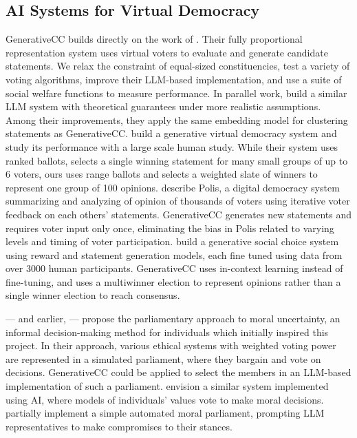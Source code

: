 \documentclass[letterpaper]{article} %
\begin{document}
\subsection{AI Systems for Virtual Democracy}
GenerativeCC builds directly on the work of \citet{fish-v2}.
Their fully proportional representation system \citep{monroe-1995} uses virtual voters to evaluate and generate candidate statements.
We relax the constraint of equal-sized constituencies, test a variety of voting algorithms, improve their LLM-based implementation, and use a suite of social welfare functions to measure performance.
In parallel work, \citet{gsc-next-gen} build a similar LLM system with theoretical guarantees under more realistic assumptions.
Among their improvements, they apply the same embedding model for clustering statements as GenerativeCC.
\citet{habermas-machine} build a generative virtual democracy system and study its performance with a large scale human study.
While their system uses ranked ballots, selects a single winning statement for many small groups of up to 6 voters, ours uses range ballots and selects a weighted slate of winners to represent one group of 100 opinions.
\citet{polis} describe Polis, a digital democracy system summarizing and analyzing of opinion of thousands of voters using iterative voter feedback on each others' statements.
GenerativeCC generates new statements and requires voter input only once, eliminating the bias in Polis related to varying levels and timing of voter participation.
\citet{bakker-consensus} build a generative social choice system using reward and statement generation models, each fine tuned using data from over 3000 human participants.
GenerativeCC uses in-context learning \citep{xie-in-context-learning-2021} instead of fine-tuning, and uses a multiwinner election to represent opinions rather than a single winner election to reach consensus.

\citet{newberry-moral-parliaments} --- and earlier, \citet{bostrom-moral-parliaments-2009} --- propose the parliamentary approach to moral uncertainty, an informal decision-making method for individuals which initially inspired this project.
In their approach, various ethical systems with weighted voting power are represented in a simulated parliament, where they bargain and vote on decisions.
GenerativeCC could be applied to select the members in an LLM-based implementation of such a parliament.
\citet{conitzer-2017-moral-ai} envision a similar system implemented using AI, where models of individuals' values vote to make moral decisions.
\citet{ouwerx-parliaments} partially implement a simple automated moral parliament, prompting LLM representatives to make compromises to their stances.
\end{document}
